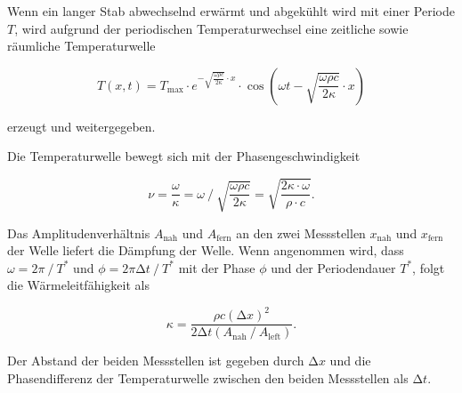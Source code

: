 \newpage

\begin{flushleft}
    Wenn ein langer Stab abwechselnd erwärmt und abgekühlt wird mit einer Periode $ T $,  
    wird aufgrund der periodischen Temperaturwechsel eine zeitliche sowie räumliche Temperaturwelle 
\end{flushleft}

\begin{equation}
    T(x,t) = T_{\text{max}} \cdot e^{-\sqrt{\frac{\omega \rho c}{2\kappa}} \cdot x} \cdot \cos\left({\omega t - \sqrt{\frac{\omega \rho c}{2\kappa}} \cdot x }\right)\label{4}
\end{equation}

\begin{flushleft}
    erzeugt und weitergegeben.
\end{flushleft}

\begin{flushleft}
    Die Temperaturwelle bewegt sich mit der Phasengeschwindigkeit 
\end{flushleft}

\begin{equation}
   \nu = \frac{\omega}{\kappa} = \omega \mathbin{/} \sqrt{\frac{\omega \rho c}{2\kappa}} = \sqrt{\frac{2\kappa \cdot \omega}{\rho \cdot c}}.
\end{equation}

\begin{flushleft}
    Das Amplitudenverhältnis $A_{\text{nah}}$ und $ A_{\text{fern}} $ an den zwei Messstellen $ x_{\text{nah}} $ und $ x_{\text{fern}} $ der Welle liefert die Dämpfung der Welle. 
    Wenn angenommen wird, dass $\omega = 2\pi \mathbin{/} T^*$ und $ \phi = 2\pi \increment t \mathbin{/} T^*  $ mit der Phase $ \phi $ und der Periodendauer $T^*$, folgt die Wärmeleitfähigkeit als
\end{flushleft}

\begin{equation}
    \kappa = \frac{\rho c (\increment x)^2 }{2 \increment t \left(A_{\text{nah}} \mathbin{/} A_{\text{left}}\right)}. \label{6}
\end{equation}
 
\begin{flushleft}
    Der Abstand der beiden Messstellen ist gegeben durch $ \increment x $ und die Phasendifferenz der Temperaturwelle zwischen den beiden Messstellen als $ \increment t $.
\end{flushleft}

